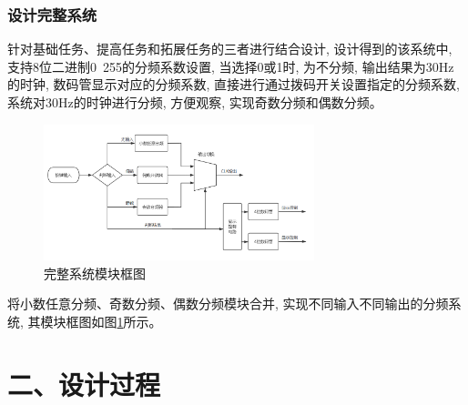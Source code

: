 \documentclass{article}
\newcommand{\fourhao}{\fontsize{14pt}{\baselineskip}\selectfont} %
\newcommand{\xiaosihao}{\fontsize{12pt}{\baselineskip}\selectfont} %
\begin{document}
\subsubsection*{设计完整系统}
针对基础任务、提高任务和拓展任务的三者进行结合设计, 设计得到的该系统中, 支持8位二进制0~255的分频系数设置, 当选择0或1时, 为不分频, 输出结果为30Hz的时钟, 数码管显示对应的分频系数, 
直接进行通过拨码开关设置指定的分频系数, 系统对30Hz的时钟进行分频, 方便观察, 实现奇数分频和偶数分频。\\
\begin{figure}
    \centering
    \includegraphics[width=0.7\textwidth]{image/2024-06-28-15-55-33.png}
    \caption{完整系统模块框图}
    \label{image_principle_1}
\end{figure}
将小数任意分频、奇数分频、偶数分频模块合并, 实现不同输入不同输出的分频系统, 其模块框图如图\ref{image_principle_1}所示。
\section*{\fourhao 二、设计过程}
\xiaosihao
{}
\end{document}
